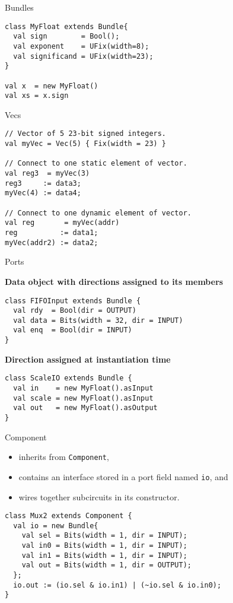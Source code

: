 \documentclass[xcolor=pdflatex,dvipsnames,table]{beamer}
\begin{document}
\begin{frame}[fragile]{Bundles}
\begin{lstlisting}
class MyFloat extends Bundle{
  val sign        = Bool();
  val exponent    = UFix(width=8);
  val significand = UFix(width=23);
}

val x  = new MyFloat()
val xs = x.sign
\end{lstlisting}
\end{frame}

\begin{frame}[fragile]{Vecs}
\begin{lstlisting}
// Vector of 5 23-bit signed integers.
val myVec = Vec(5) { Fix(width = 23) } 

// Connect to one static element of vector.
val reg3  = myVec(3)                   
reg3     := data3; 
myVec(4) := data4;

// Connect to one dynamic element of vector.
val reg       = myVec(addr)
reg          := data1;
myVec(addr2) := data2;
\end{lstlisting}
\end{frame}

\begin{frame}[fragile]{Ports}

\textbf{Data object with directions assigned to its members}

\begin{lstlisting}
class FIFOInput extends Bundle {
  val rdy  = Bool(dir = OUTPUT)
  val data = Bits(width = 32, dir = INPUT)
  val enq  = Bool(dir = INPUT)
}
\end{lstlisting}

\textbf{Direction assigned at instantiation time}

\begin{lstlisting}
class ScaleIO extends Bundle {
  val in    = new MyFloat().asInput
  val scale = new MyFloat().asInput
  val out   = new MyFloat().asOutput
}
\end{lstlisting}
\end{frame}

\begin{frame}{Component}

\begin{itemize}
\item inherits from \verb+Component+,
\item contains an interface stored in a port field named \verb+io+, and
\item wires together subcircuits in its constructor.
\end{itemize}

\begin{lstlisting}
class Mux2 extends Component {
  val io = new Bundle{
    val sel = Bits(width = 1, dir = INPUT);
    val in0 = Bits(width = 1, dir = INPUT);
    val in1 = Bits(width = 1, dir = INPUT);
    val out = Bits(width = 1, dir = OUTPUT);
  };
  io.out := (io.sel & io.in1) | (~io.sel & io.in0);
}
\end{lstlisting}

\end{frame}
\end{document}
